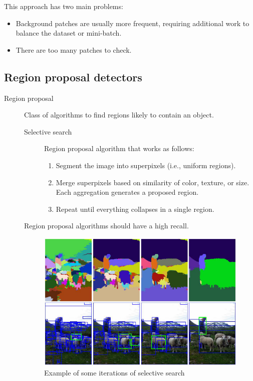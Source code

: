\begin{description}
\begin{remark}
            This approach has two main problems:
            \begin{itemize}
                \item Background patches are usually more frequent, requiring additional work to balance the dataset or mini-batch.
                \item There are too many patches to check.
            \end{itemize}
        \end{remark}
\end{description}


\subsection{Region proposal detectors}

\begin{description}
    \item[Region proposal] 
        Class of algorithms to find regions likely to contain an object.

        \begin{description}
            \item[Selective search] 
            Region proposal algorithm that works as follows:
            \begin{enumerate}
                \item Segment the image into superpixels (i.e., uniform regions).
                \item Merge superpixels based on similarity of color, texture, or size. Each aggregation generates a proposed region.
                \item Repeat until everything collapses in a single region.
            \end{enumerate}
        \end{description}

        \begin{remark}
            Region proposal algorithms should have a high recall.
        \end{remark}

        \begin{figure}[H]
            \centering
            \includegraphics[width=0.45\linewidth]{./img/selective_search.png}
            \caption{Example of some iterations of selective search}
        \end{figure}


\end{description}
